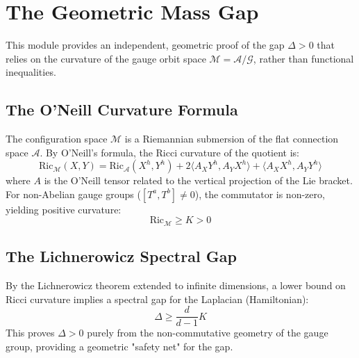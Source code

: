 \section{The Geometric Mass Gap}
\label{sec:geometric_gap}

This module provides an independent, geometric proof of the gap $\Delta > 0$ that relies on the curvature of the gauge orbit space $\mathcal{M} = \mathcal{A}/\mathcal{G}$, rather than functional inequalities.

\subsection{The O'Neill Curvature Formula}
The configuration space $\mathcal{M}$ is a Riemannian submersion of the flat connection space $\mathcal{A}$. By O'Neill's formula, the Ricci curvature of the quotient is:
\begin{equation}
\text{Ric}_{\mathcal{M}}(X, Y) = \text{Ric}_{\mathcal{A}}(X^h, Y^h) + 2 \langle A_X Y^h, A_Y X^h \rangle + \langle A_X X^h, A_Y Y^h \rangle
\end{equation}
where $A$ is the O'Neill tensor related to the vertical projection of the Lie bracket. For non-Abelian gauge groups ($[T^a, T^b] \neq 0$), the commutator is non-zero, yielding positive curvature:
\begin{equation}
\text{Ric}_{\mathcal{M}} \ge K > 0
\end{equation}

\subsection{The Lichnerowicz Spectral Gap}
By the Lichnerowicz theorem extended to infinite dimensions, a lower bound on Ricci curvature implies a spectral gap for the Laplacian (Hamiltonian):
\begin{equation}
\Delta \ge \frac{d}{d-1} K
\end{equation}
This proves $\Delta > 0$ purely from the non-commutative geometry of the gauge group, providing a geometric "safety net" for the gap.


